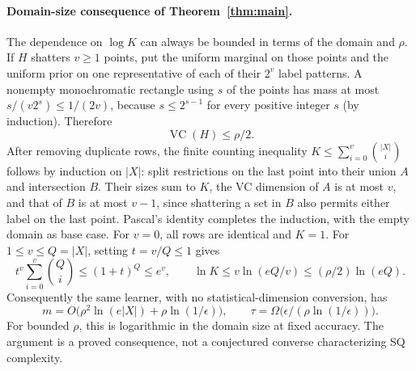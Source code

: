 \paragraph{Domain-size consequence of Theorem~\ref{thm:main}.}
The dependence on $\log K$ can always be bounded in terms of the domain and $\rho$. If $H$ shatters $v\ge1$ points, put the uniform marginal on those points and the uniform prior on one representative of each of their $2^v$ label patterns. A nonempty monochromatic rectangle using $s$ of the points has mass at most $s/(v2^s)\le1/(2v)$, because $s\le2^{s-1}$ for every positive integer $s$ (by induction). Therefore
\[
 \operatorname{VC}(H)\le\rho/2.
\]
After removing duplicate rows, the finite counting inequality $K\le\sum_{i=0}^v\binom{|X|}{i}$ follows by induction on $|X|$: split restrictions on the last point into their union $A$ and intersection $B$. Their sizes sum to $K$, the VC dimension of $A$ is at most $v$, and that of $B$ is at most $v-1$, since shattering a set in $B$ also permits either label on the last point. Pascal's identity completes the induction, with the empty domain as base case. For $v=0$, all rows are identical and $K=1$. For $1\le v\le Q=|X|$, setting $t=v/Q\le1$ gives
\[
 t^v\sum_{i=0}^v\binom Qi\le(1+t)^Q\le e^v,
 \qquad \ln K\le v\ln(eQ/v)\le(\rho/2)\ln(eQ).
\]
Consequently the same learner, with no statistical-dimension conversion, has
\[
 \boxed{m=O\bigl(\rho^2\ln(e|X|)+\rho\ln(1/\epsilon)\bigr),
 \qquad \tau=\Omega\bigl(\epsilon/(\rho\ln(1/\epsilon))\bigr).}
\]
For bounded $\rho$, this is logarithmic in the domain size at fixed accuracy. The argument is a proved consequence, not a conjectured converse characterizing SQ complexity.
